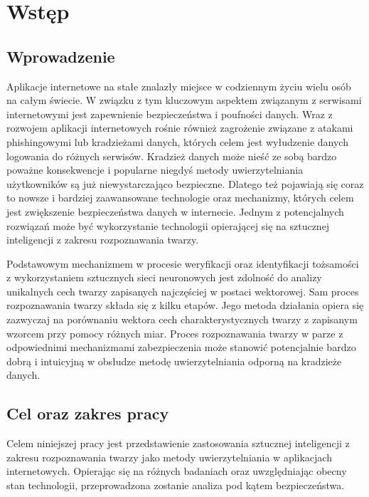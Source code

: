 \chapter{Wstęp}
\section{Wprowadzenie}
Aplikacje internetowe na stałe znalazły miejsce w codziennym życiu wielu osób na całym
świecie. W związku z tym kluczowym aspektem związanym z serwisami internetowymi jest zapewnienie bezpieczeństwa i poufności danych. Wraz z rozwojem aplikacji internetowych rośnie
również zagrożenie związane z atakami phishingowymi lub kradzieżami danych, których celem
jest wyłudzenie danych logowania do różnych serwisów. Kradzież danych może nieść ze sobą
bardzo poważne konsekwencje i popularne niegdyś metody uwierzytelniania użytkowników są
już niewystarczająco bezpieczne. Dlatego też pojawiają się coraz to nowsze i bardziej zaawansowane technologie oraz mechanizmy, których celem jest zwiększenie bezpieczeństwa danych w
internecie. Jednym z potencjalnych rozwiązań może być wykorzystanie technologii opierającej
się na sztucznej inteligencji z zakresu rozpoznawania twarzy.

Podstawowym mechanizmem w procesie weryfikacji oraz identyfikacji tożsamości z wykorzystaniem sztucznych sieci neuronowych jest zdolność do analizy unikalnych cech twarzy zapisanych najczęściej w postaci wektorowej. Sam proces rozpoznawania twarzy składa się z kilku
etapów. Jego metoda działania opiera się zazwyczaj na porównaniu wektora cech charakterystycznych twarzy z zapisanym wzorcem przy pomocy różnych miar. Proces rozpoznawania twarzy
w parze z odpowiednimi mechanizmami zabezpieczenia może stanowić potencjalnie bardzo dobrą i intuicyjną w obsłudze metodę uwierzytelniania odporną na kradzieże danych.


\section{Cel oraz zakres pracy}
Celem niniejszej pracy jest przedstawienie zastosowania sztucznej inteligencji z zakresu rozpoznawania twarzy jako metody uwierzytelniania w aplikacjach internetowych. Opierając się na różnych badaniach oraz uwzględniając obecny stan technologii, przeprowadzona zostanie analiza pod kątem bezpieczeństwa.


